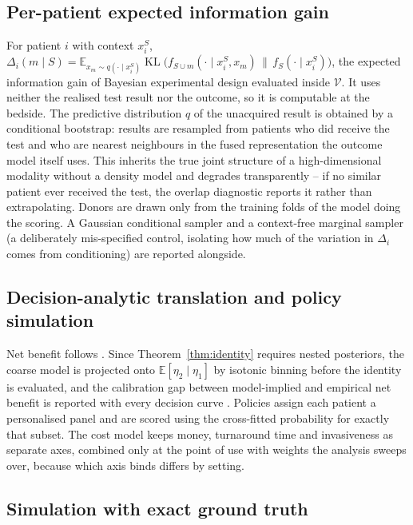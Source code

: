 \documentclass[11pt]{article}
\theoremstyle{definition}
\theoremstyle{remark}
\DeclareMathOperator{\KL}{KL}
\newcommand{\Vc}{\mathcal{V}}
\begin{document}
\subsection{Per-patient expected information gain}
\label{sec:gain}

For patient $i$ with context $x_i^S$,
$\Delta_i(m\mid S) = \mathbb{E}_{x_m\sim q(\cdot\mid x_i^S)}
\KL\big(f_{S\cup m}(\cdot\mid x_i^S,x_m)\,\|\,f_S(\cdot\mid x_i^S)\big)$,
the expected information gain of Bayesian experimental design
\citep{lindley1956measure,chaloner1995bayesian} evaluated inside $\Vc$. It uses
neither the realised test result nor the outcome, so it is computable at the
bedside. The predictive distribution $q$ of the unacquired result is obtained by
a conditional bootstrap: results are resampled from patients who did receive the
test and who are nearest neighbours in the fused representation the outcome
model itself uses. This inherits the true joint structure of a high-dimensional
modality without a density model and degrades transparently -- if no similar
patient ever received the test, the overlap diagnostic reports it rather than
extrapolating. Donors are drawn only from the training folds of the model doing
the scoring. A Gaussian conditional sampler and a context-free marginal sampler
(a deliberately mis-specified control, isolating how much of the variation in
$\Delta_i$ comes from conditioning) are reported alongside.

\subsection{Decision-analytic translation and policy simulation}

Net benefit follows \citet{vickers2006decision}. Since Theorem~\ref{thm:identity}
requires nested posteriors, the coarse model is projected onto
$\mathbb{E}[\eta_2\mid \eta_1]$ by isotonic binning before the identity is
evaluated, and the calibration gap between model-implied and empirical net
benefit is reported with every decision curve
\citep{vancalster2019calibration}. Policies assign each patient a personalised
panel and are scored using the cross-fitted probability for exactly that subset.
The cost model keeps money, turnaround time and invasiveness as separate axes,
combined only at the point of use with weights the analysis sweeps over, because
which axis binds differs by setting.

\subsection{Simulation with exact ground truth}
\label{sec:sim}
\end{document}
